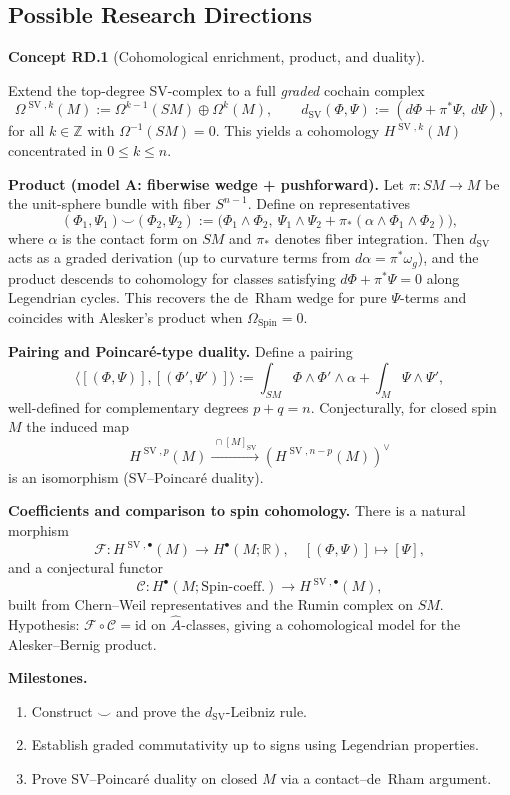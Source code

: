 \documentclass[10pt, letterpaper]{article}
\newcommand{\R}{\mathbb{R}}
\newcommand{\Spin}{\mathrm{Spin}}
\newcommand{\CustomHeading}[3]{%
  \par\medskip\noindent%
  \textbf{#1 #2} \textnormal{(#3)}.\enskip%
}
\newenvironment{CONC}[2]{\begin{unitbox}\CustomHeading{Concept}{#1}{#2}}{\end{unitbox}}
\begin{document}
\subsection{Possible Research Directions}

\begin{CONC}{RD.1}{Cohomological enrichment, product, and duality}
Extend the top-degree SV-complex to a full \emph{graded} cochain complex
\[
\Omega^{\operatorname{SV},k}(M):=\Omega^{k-1}(SM)\oplus\Omega^k(M),
\qquad
d_{\operatorname{SV}}(\Phi,\Psi):=(d\Phi+\pi^*\Psi,\ d\Psi),
\]
for all $k\in\mathbb Z$ with $\Omega^{-1}(SM)=0$.
This yields a cohomology $H^{\operatorname{SV},k}(M)$ concentrated in $0\le k\le n$.

\medskip\noindent\textbf{Product (model A: fiberwise wedge + pushforward).}
Let $\pi:SM\to M$ be the unit-sphere bundle with fiber $S^{n-1}$.
Define on representatives
\[
(\Phi_1,\Psi_1)\smile(\Phi_2,\Psi_2)
:=\Big(
\Phi_1\wedge\Phi_2,\ 
\Psi_1\wedge\Psi_2+\pi_*(\alpha\wedge\Phi_1\wedge\Phi_2)
\Big),
\]
where $\alpha$ is the contact form on $SM$ and $\pi_*$ denotes fiber integration.
Then $d_{\operatorname{SV}}$ acts as a graded derivation (up to curvature terms from $d\alpha=\pi^*\omega_g$), and the product descends to cohomology for classes satisfying $d\Phi+\pi^*\Psi=0$ along Legendrian cycles.
This recovers the de~Rham wedge for pure $\Psi$-terms and coincides with Alesker’s product when $\Omega_{\Spin}=0$.

\medskip\noindent\textbf{Pairing and Poincaré-type duality.}
Define a pairing
\[
\langle[(\Phi,\Psi)],[(\Phi',\Psi')]\rangle
:=\int_{SM}\Phi\wedge\Phi'\wedge\alpha+\int_M\Psi\wedge\Psi',
\]
well-defined for complementary degrees $p+q=n$.
Conjecturally, for closed spin $M$ the induced map
\[
H^{\operatorname{SV},p}(M)\xrightarrow{\ \cap[M]_{\operatorname{SV}}\ }(H^{\operatorname{SV},n-p}(M))^\vee
\]
is an isomorphism (SV–Poincaré duality).

\medskip\noindent\textbf{Coefficients and comparison to spin cohomology.}
There is a natural morphism
\[
\mathcal F:H^{\operatorname{SV},\bullet}(M)\to H^\bullet(M;\R),\quad[(\Phi,\Psi)]\mapsto[\Psi],
\]
and a conjectural functor
\[
\mathcal C:H^\bullet(M;\Spin\text{-coeff.})\to H^{\operatorname{SV},\bullet}(M),
\]
built from Chern--Weil representatives and the Rumin complex on $SM$.
Hypothesis: $\mathcal F\circ\mathcal C=\mathrm{id}$ on $\widehat A$-classes, giving a cohomological model for the Alesker--Bernig product.

\medskip\noindent\textbf{Milestones.}
\begin{enumerate}[label=(\roman*)]
\item Construct $\smile$ and prove the $d_{\operatorname{SV}}$-Leibniz rule.
\item Establish graded commutativity up to signs using Legendrian properties.
\item Prove SV–Poincaré duality on closed $M$ via a contact–de~Rham argument.
\end{enumerate}
\end{CONC}
\end{document}
